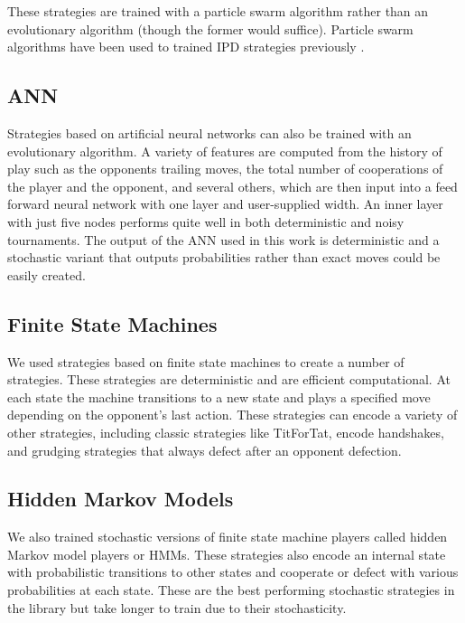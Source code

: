 \documentclass{article}
\begin{document}
These strategies are trained with a particle swarm algorithm rather than an
evolutionary algorithm (though the former would suffice). Particle swarm
algorithms have been used to trained IPD strategies previously
\cite{franken2005particle}.


\subsection{ANN}

Strategies based on artificial neural networks can also be trained with an
evolutionary algorithm. A variety of features are computed from the history
of play such as the opponents trailing moves, the total number of cooperations
of the player and the opponent, and several others, which are then input
into a feed forward neural network with one layer and user-supplied width.
An inner layer with just five nodes performs quite well in both deterministic and
noisy tournaments. The output of the ANN used in this work is deterministic and
a stochastic variant that outputs probabilities rather than exact moves could
be easily created.


\subsection{Finite State Machines}

We used strategies based on finite state machines to create a number of
strategies. These strategies are deterministic and are efficient computational.
At each state the machine transitions to a new state and plays a specified move
depending on the opponent's last action. These strategies can encode a variety
of other strategies, including classic strategies like TitForTat, encode
handshakes, and grudging strategies that always defect after an opponent
defection.


\subsection{Hidden Markov Models}

We also trained stochastic versions of finite state machine players called
hidden Markov model players or HMMs. These strategies also encode an internal
state with probabilistic transitions to other states and cooperate or defect
with various probabilities at each state. These are the best performing
stochastic strategies in the library but take longer to train due to their
stochasticity.
\end{document}
